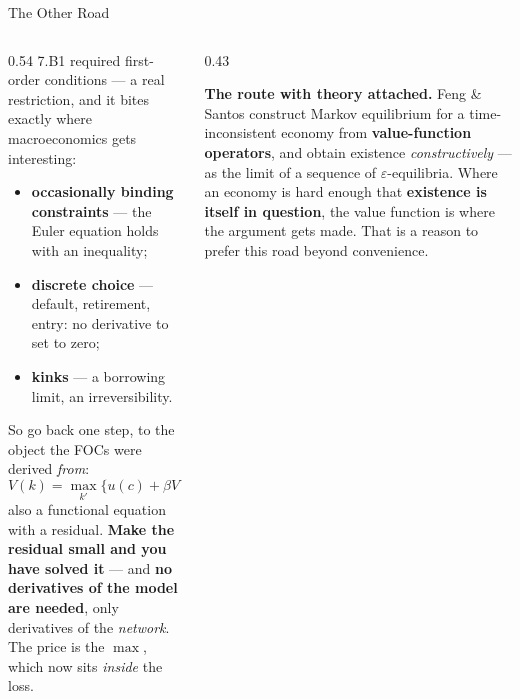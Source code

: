 \begin{frame}{The Other Road}
\begin{columns}[T]
\begin{column}{0.54\textwidth}
\small
7.B1 required first-order conditions --- a real restriction, and it bites exactly where macroeconomics gets interesting:
\smallskip
\begin{itemize}\small\setlength{\itemsep}{0.7mm}
  \item \textbf{occasionally binding constraints} --- the Euler equation holds with an inequality;
  \item \textbf{discrete choice} --- default, retirement, entry: no derivative to set to zero;
  \item \textbf{kinks} --- a borrowing limit, an irreversibility.
\end{itemize}
\smallskip

So go back one step, to the object the FOCs were derived \emph{from}:
\[
  V(k)=\max_{k'}\bigl\{u(c)+\beta V(k')\bigr\},
\]
also a functional equation with a residual. \textbf{Make the residual small and you have solved it} --- and \textbf{no derivatives of the model are needed}, only derivatives of the \emph{network}. The price is the $\max$, which now sits \emph{inside} the loss.
\end{column}
\begin{column}{0.43\textwidth}
\begin{researchbox}\small
\textbf{The route with theory attached.}
\medskip
Feng \& Santos construct Markov equilibrium for a time-inconsistent economy from \textbf{value-function operators}, and obtain existence \emph{constructively} --- as the limit of a sequence of $\varepsilon$-equilibria.
\medskip
Where an economy is hard enough that \textbf{existence is itself in question}, the value function is where the argument gets made. That is a reason to prefer this road beyond convenience.
\end{researchbox}
\end{column}
\end{columns}
\vspace{1mm}
\end{frame}

